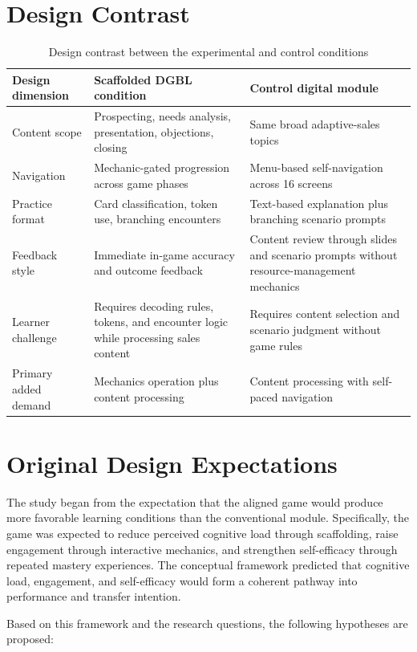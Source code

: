 \documentclass[12pt]{report}
\begin{document}
\section{Design Contrast}
\begin{table}[htbp]
\centering
\caption{Design contrast between the experimental and control conditions}
\label{tab:design-contrast-system}
\small
\begin{tabularx}{\textwidth}{L{3.1cm}Y Y}
\toprule
\textbf{Design dimension} & \textbf{Scaffolded DGBL condition} & \textbf{Control digital module} \\
\midrule
Content scope & Prospecting, needs analysis, presentation, objections, closing & Same broad adaptive-sales topics \\
Navigation & Mechanic-gated progression across game phases & Menu-based self-navigation across 16 screens \\
Practice format & Card classification, token use, branching encounters & Text-based explanation plus branching scenario prompts \\
Feedback style & Immediate in-game accuracy and outcome feedback & Content review through slides and scenario prompts without resource-management mechanics \\
Learner challenge & Requires decoding rules, tokens, and encounter logic while processing sales content & Requires content selection and scenario judgment without game rules \\
Primary added demand & Mechanics operation plus content processing & Content processing with self-paced navigation \\
\bottomrule
\end{tabularx}
\normalsize
\end{table}

\section{Original Design Expectations}
The study began from the expectation that the aligned game would produce more favorable learning conditions than the conventional module. Specifically, the game was expected to reduce perceived cognitive load through scaffolding, raise engagement through interactive mechanics, and strengthen self-efficacy through repeated mastery experiences. The conceptual framework predicted that cognitive load, engagement, and self-efficacy would form a coherent pathway into performance and transfer intention.

Based on this framework and the research questions, the following hypotheses are proposed:
\end{document}
